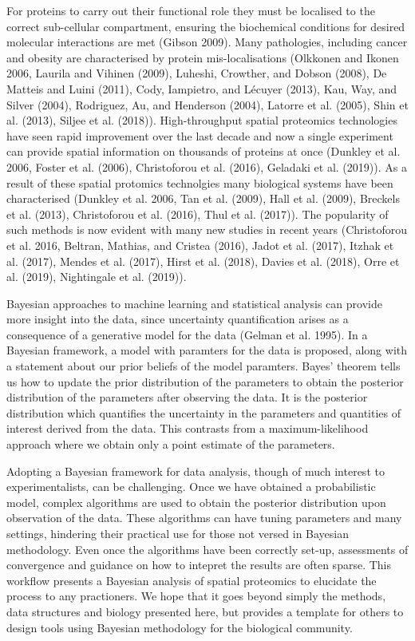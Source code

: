 \documentclass[]{article}
\begin{document}
For proteins to carry out their functional role they must be localised
to the correct sub-cellular compartment, ensuring the biochemical
conditions for desired molecular interactions are met (Gibson 2009).
Many pathologies, including cancer and obesity are characterised by
protein mis-localisations (Olkkonen and Ikonen 2006, Laurila and Vihinen
(2009), Luheshi, Crowther, and Dobson (2008), De Matteis and Luini
(2011), Cody, Iampietro, and Lécuyer (2013), Kau, Way, and Silver
(2004), Rodriguez, Au, and Henderson (2004), Latorre et al. (2005), Shin
et al. (2013), Siljee et al. (2018)). High-throughput spatial proteomics
technologies have seen rapid improvement over the last decade and now a
single experiment can provide spatial information on thousands of
proteins at once (Dunkley et al. 2006, Foster et al. (2006),
Christoforou et al. (2016), Geladaki et al. (2019)). As a result of
these spatial protomics technolgies many biological systems have been
characterised (Dunkley et al. 2006, Tan et al. (2009), Hall et al.
(2009), Breckels et al. (2013), Christoforou et al. (2016), Thul et al.
(2017)). The popularity of such methods is now evident with many new
studies in recent years (Christoforou et al. 2016, Beltran, Mathias, and
Cristea (2016), Jadot et al. (2017), Itzhak et al. (2017), Mendes et al.
(2017), Hirst et al. (2018), Davies et al. (2018), Orre et al. (2019),
Nightingale et al. (2019)).

Bayesian approaches to machine learning and statistical analysis can
provide more insight into the data, since uncertainty quantification
arises as a consequence of a generative model for the data (Gelman et
al. 1995). In a Bayesian framework, a model with paramters for the data
is proposed, along with a statement about our prior beliefs of the model
paramters. Bayes' theorem tells us how to update the prior distribution
of the parameters to obtain the posterior distribution of the parameters
after observing the data. It is the posterior distribution which
quantifies the uncertainty in the parameters and quantities of interest
derived from the data. This contrasts from a maximum-likelihood approach
where we obtain only a point estimate of the parameters.

Adopting a Bayesian framework for data analysis, though of much interest
to experimentalists, can be challenging. Once we have obtained a
probabilistic model, complex algorithms are used to obtain the posterior
distribution upon observation of the data. These algorithms can have
tuning parameters and many settings, hindering their practical use for
those not versed in Bayesian methodology. Even once the algorithms have
been correctly set-up, assessments of convergence and guidance on how to
intepret the results are often sparse. This workflow presents a Bayesian
analysis of spatial proteomics to elucidate the process to any
practioners. We hope that it goes beyond simply the methods, data
structures and biology presented here, but provides a template for
others to design tools using Bayesian methodology for the biological
community.
\end{document}
